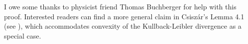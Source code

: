 \documentclass[11pt]{article}
\begin{document}
I owe some thanks to physicist friend Thomas Buchberger for help with
this proof. Interested readers can find a more general claim in
Csisz{\'a}r's Lemma 4.1 (see ), which
accommodates convexity of the Kullback-Leibler divergence as a special
case.

 

\end{document}

